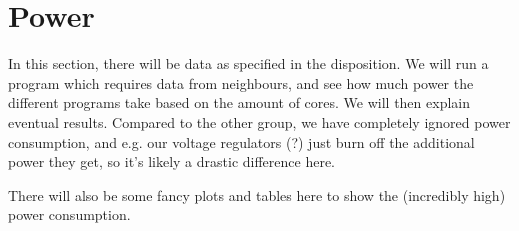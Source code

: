 \section{Power}

In this section, there will be data as specified in the disposition. We will run
a program which requires data from neighbours, and see how much power the
different programs take based on the amount of cores. We will then explain
eventual results. Compared to the other group, we have completely ignored power
consumption, and e.g. our voltage regulators (?) just burn off the additional
power they get, so it's likely a drastic difference here.

There will also be some fancy plots and tables here to show the (incredibly
high) power consumption.
